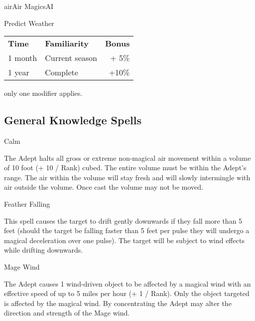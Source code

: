 \begin{college}[2.1]{air}{Air Magics}{AI}
\begin{talent}[T-3]{Predict Weather}
\begin{effects}
\begin{tabularx}{\linewidth}{lXr}
\textbf{Time}	& \textbf{Familiarity}	& \textbf{Bonus} \\
1 month		& Current season	& + 5\% \dag \\
1 year		& Complete		& +10\% \dag \\
\end{tabularx}
\dag only one modifier applies.
\end{effects}
\end{talent}

\subsection{General Knowledge Spells}

\begin{spell}[G-1]{Calm}

\begin{effects}
The Adept halts all gross or extreme non-magical air movement within a
volume of 10 foot (+ 10 / Rank) cubed. The entire volume must be
within the Adept's range. The air within the volume will stay fresh
and will slowly intermingle with air outside the volume. Once cast the
volume may not be moved.
\end{effects}
\end{spell}

\begin{spell}[G-2]{Feather Falling}

\begin{effects}
This spell causes the target to drift gently downwards if they fall
more than 5 feet (should the target be falling faster than 5 feet per
pulse they will undergo a magical deceleration over one pulse). The
target will be subject to wind effects while drifting downwards.
\end{effects}
\end{spell}

\begin{spell}[G-3]{Mage Wind}

\begin{effects}
The Adept causes 1 wind-driven object to be affected by a magical wind
with an effective speed of up to 5 miles per hour (+ 1 / Rank). Only
the object targeted is affected by the magical wind. By concentrating
the Adept may alter the direction and strength of the Mage wind.
\end{effects}
\end{spell}


\end{college}
